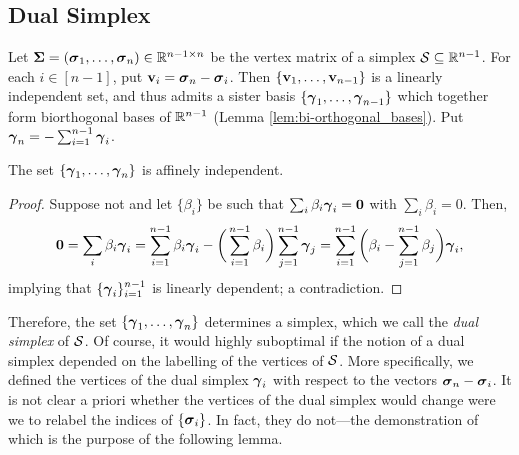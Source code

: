 \subsection{Dual Simplex}
\label{sec:dual_simplex}
Let $\boldsymbol{\Sigma}=(\vb*{\sigma}_1,\dots,\vb*{\sigma}_n)\in\mathbb{R}^{n-1\times n}$ be the vertex matrix of a simplex $\mathcal{S}\subseteq\mathbb{R}^{n-1}$. For each $i\in[n-1]$, put $\vb{v}_i=\vb*{\sigma}_n-\vb*{\sigma}_i$. Then $\{\vb{v}_1,\dots,\vb{v}_{n-1}\}$ is a linearly independent set, and thus admits a sister basis $\{\vb*{\gamma}_1,\dots,\vb*{\gamma}_{n-1}\}$ which together form biorthogonal bases of $\mathbb{R}^{n-1}$ (Lemma \ref{lem:bi-orthogonal_bases}). Put $\vb*{\gamma}_n = -\sum_{i=1}^{n-1}\vb*{\gamma}_i$.  

\begin{claim}
The set 
$\{\vb*{\gamma}_1,\dots,\vb*{\gamma}_n\}$ is affinely independent. 
\end{claim}
\begin{proof}
Suppose not and let $\{\beta_i\}$ be such that $\sum_i \beta_i \vb*{\gamma}_i =\vb{0}$ with $\sum_i\beta_i=0$. Then, 
\[\vb{0} = \sum_i\beta_i\vb*{\gamma}_i = \sum_{i=1}^{n-1} \beta_i \vb*{\gamma}_i - \bigg(\sum_{i=1}^{n-1} \beta_i\bigg)\sum_{j=1}^{n-1}\vb*{\gamma}_j = \sum_{i=1}^{n-1}\bigg(\beta_i-\sum_{j=1}^{n-1}\beta_j\bigg)\vb*{\gamma}_i,\]
implying that $\{\vb*{\gamma}_i\}_{i=1}^{n-1}$ is linearly dependent; a contradiction.  
\end{proof}

Therefore, the set $\{\vb*{\gamma}_1,\dots,\vb*{\gamma}_n\}$ determines a simplex, which we call the \emph{dual simplex} of $\mathcal{S}$. Of course, it would highly suboptimal if the notion of a dual simplex depended on the labelling of the vertices of $\mathcal{S}$. More specifically, we defined the vertices of the dual simplex $\vb*{\gamma}_i$ with respect to the vectors $\vb*{\sigma}_n-\vb*{\sigma}_i$. It is not clear a priori whether the vertices of the dual simplex would change were we to relabel the indices of $\{\vb*{\sigma}_i\}$. In fact, they do not---the demonstration of which is the purpose of the following lemma. 

